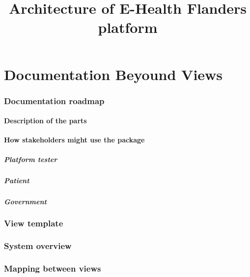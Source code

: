 \documentclass[a4paper,10pt]{report}
\title{Architecture of E-Health Flanders platform}
\author{}
\begin{document}
\maketitle

\begin{abstract}
\end{abstract}

\part{Documentation Beyound Views}

\section{Documentation roadmap}

\subsection{Description of the parts}

\subsection{How stakeholders might use the package}

\subsubsection{Platform tester}

\subsubsection{Patient}

\subsubsection{Government}

\section{View template}

\section{System overview}

\section{Mapping between views}
\end{document}
